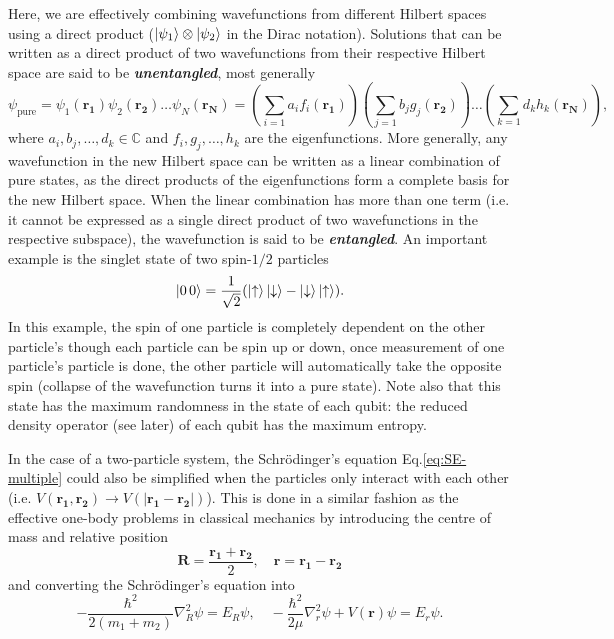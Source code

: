 \documentclass{article}
\newcommand{\up}{\ket{\uparrow}} %
\newcommand{\dn}{\ket{\downarrow}} %
\theoremstyle{nonumberplain}
\begin{document}
Here, we are effectively combining wavefunctions from different Hilbert spaces using a direct product ($\ket{\psi_1}\otimes \ket{\psi_2}$ in the Dirac notation). Solutions that can be written as a direct product of two wavefunctions from their respective Hilbert space are said to be \textit{\textbf{unentangled}}, most generally 
\[
    \psi_{\text{pure}} = \psi_{1}(\mathbf{r_1}) \psi_{2}(\mathbf{r_2} ) \ldots  \psi_N (\mathbf{r_N}) =   
    \left( 
        \sum_{i=1} a_i f_{i} (\mathbf{r_1} )
    \right)
    \left( 
        \sum_{j=1} b_j g_{j} (\mathbf{r_2} )
    \right)
    \ldots 
    \left( 
        \sum_{k=1} d_k h_{k} (\mathbf{r_N} )
    \right), 
\]
where $a_i, b_j, \ldots , d_k \in \mathbb{C} $ and $f_i, g_j, \ldots , h_k $ are the eigenfunctions. More generally, any wavefunction in the new Hilbert space can be written as a linear combination of pure states, as the direct products of the eigenfunctions form a complete basis for the new Hilbert space. When the linear combination has more than one term (i.e. it cannot be expressed as a single direct product of two wavefunctions in the respective subspace), the wavefunction is said to be \textit{\textbf{entangled}}. An important example is the singlet state of two spin-$1/2$ particles 
\[
    \ket{0 \, 0} = \frac{1}{\sqrt{2} } (\up \dn - \dn \up).
\]
In this example, the spin of one particle is completely dependent on the other particle's \textemdash though each particle can be spin up or down, once measurement of one particle's particle is done, the other particle will automatically take the opposite spin (collapse of the wavefunction turns it into a pure state). Note also that this state has the maximum randomness in the state of each qubit: the reduced density operator (see later) of each qubit has the maximum entropy. 

In the case of a two-particle system, the Schrödinger's equation Eq.\eqref{eq:SE-multiple} could also be simplified when the particles only interact with each other (i.e. $V(\mathbf{r_1},\mathbf{r_2} ) \to V(\left\vert \mathbf{r_1} - \mathbf{r_2}   \right\vert   )$). This is done in a similar fashion as the effective one-body problems in classical mechanics by introducing the centre of mass and relative position 
\[
    \mathbf{R}  = \frac{\mathbf{r_1} + \mathbf{r_2} }{2}, \quad 
    \mathbf{r}  = \mathbf{r_1} - \mathbf{r_2}
\] 
and converting the Schrödinger's equation into 
\[
        -\frac{\hbar ^{2} }{2(m_1+ m_2)} \nabla^{2}_R \psi = E_R \psi ,\quad 
        -\frac{\hbar ^{2} }{2\mu } \nabla ^{2} _r \psi + V(\mathbf{r} ) \psi  = E_r \psi.
\]
\end{document}
